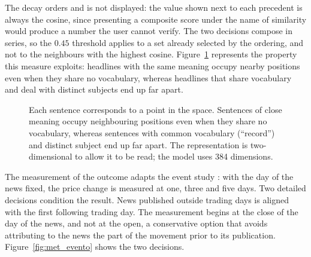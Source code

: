 The decay orders and is not displayed: the value shown next to each precedent is always the
cosine, since presenting a composite score under the name of similarity would produce a number the
user cannot verify. The two decisions compose in series, so the $0.45$ threshold applies to a set
already selected by the ordering, and not to the neighbours with the highest cosine.
Figure~\ref{fig:met_embeddings} represents the property this measure exploits: headlines with the
same meaning occupy nearby positions even when they share no vocabulary, whereas headlines that
share vocabulary and deal with distinct subjects end up far apart.

\begin{figure}[htbp]
\centering
{}
\caption[Sentences as points in a space]{Each sentence corresponds to a point in the space.
Sentences of close meaning occupy neighbouring positions even when they share no vocabulary,
whereas sentences with common vocabulary (``record'') and distinct subject end up far apart. The
representation is two-dimensional to allow it to be read; the model uses 384 dimensions.}
\label{fig:met_embeddings}
\end{figure}

The measurement of the outcome adapts the event study \autocite{brown1985daily}: with the day of
the news fixed, the price change is measured at one, three and five days. Two detailed decisions
condition the result. News published outside trading days is aligned with the first following
trading day. The measurement begins at the close of the day of the news, and not at the open, a
conservative option that avoids attributing to the news the part of the movement prior to its
publication.
Figure~\ref{fig:met_evento} shows the two decisions.

